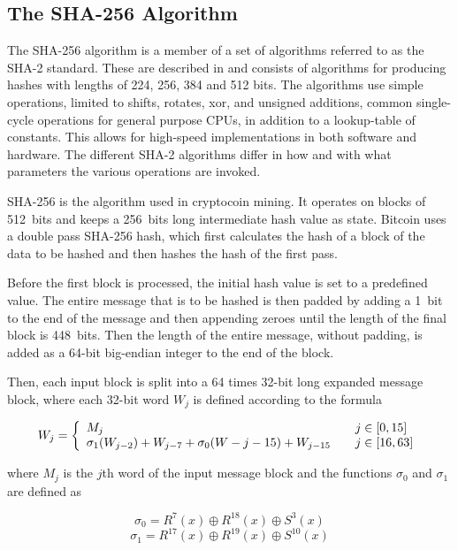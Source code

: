 \begin{appendix}

\chapter{The SHA-256 Algorithm}
\label{app:hashing-algo}

The SHA-256 algorithm is a member of a set of algorithms referred to as the SHA-2 standard.
These are described in \cite{fips180-4} and consists of algorithms for producing hashes with
lengths of 224, 256, 384 and 512 bits.
The algorithms use simple operations, limited to shifts, rotates, xor, and unsigned additions,
common single-cycle operations for general purpose CPUs, in addition to a lookup-table of constants.
This allows for high-speed implementations in both software and hardware. The different SHA-2 algorithms
differ in how and with what parameters the various operations are invoked.

SHA-256 is the algorithm used in cryptocoin mining. It operates on blocks of 512~bits and keeps
a 256~bits long intermediate hash value as state. Bitcoin uses a double pass SHA-256 hash, which
first calculates the hash of a block of the data to be hashed and then hashes the hash of the first
pass.

Before the first block is processed, the initial hash value is set to a predefined
value. The entire message that is to be hashed is then padded by adding a 1~bit to
the end of the message and then appending zeroes until the length of the final block
is 448~bits. Then the length of the entire message, without padding, is added as a
64-bit big-endian integer to the end of the block.

Then, each input block is split into a 64 times 32-bit long expanded message block, where
each 32-bit word $W_j$ is defined according to the formula

\[ W_j = \left\{
	\begin{array}{l l}
		M_j & \quad j \in \left[0, 15\right]\\
		\sigma_1(W_{j - 2}) + W_{j - 7} + \sigma_0(W-{j - 15}) + W_{j - 15} & \quad j \in \left[16, 63\right]
	\end{array}
\right.\]

\noindent where $M_j$ is the $j$th word of the input message block and the functions
$\sigma_0$ and $\sigma_1$ are defined as

\[\sigma_0 = R^7(x) \oplus R^{18}(x) \oplus S^3(x)\]
\[\sigma_1 = R^{17}(x) \oplus R^{19}(x) \oplus S^{10}(x)\]


\end{appendix}
